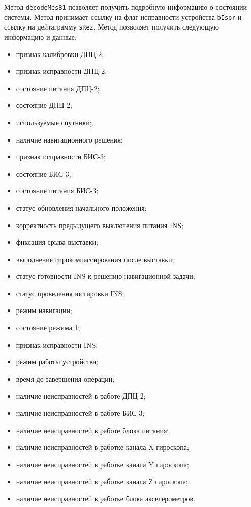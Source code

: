 \begin{enum}
	\item Метод \texttt{decodeMes81} позволяет получить подробную информацию о состоянии системы. Метод принимает
		ссылку на флаг исправности устройства \texttt{bIspr} и ссылку на дейтаграмму \texttt{sRez}.
		Метод позволяет получить следующую информацию и данные:
		\begin{itemize}
			\item признак калибровки ДПЦ-2;
			\item признак исправности ДПЦ-2;
			\item состояние питания ДПЦ-2;
			\item состояние ДПЦ-2;
			\item используемые спутники;
			\item наличие навигационного решения;
			\item признак исправности БИС-3;
			\item состояние БИС-3;
			\item состояние питания БИС-3;
			\item статус обновления начального положения;
			\item корректность предыдущего выключения питания INS;
			\item фиксация срыва выставки;
			\item выполнение гирокомпассирования после выставки;
			\item статус готовности INS к решению навигационной задачи;
			\item статус проведения юстировки INS;
			\item режим навигации;
			\item состояние режима 1;
			\item признак исправности INS;
			\item режим работы устройства;
			\item время до завершения операции;
			\item наличие неисправностей в работе ДПЦ-2;
			\item наличие неисправностей в работе БИС-3;
			\item наличие неисправностей в работе блока питания;
			\item наличие неисправностей в работке канала X гироскопа;
			\item наличие неисправностей в работке канала Y гироскопа;
			\item наличие неисправностей в работке канала Z гироскопа;
			\item наличие неисправностей в работке блока акселерометров.
		\end{itemize}


\end{enum}
